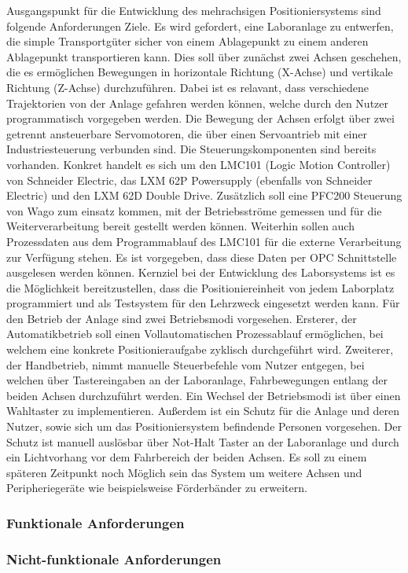 \documentclass[../Bachelorarbeit.tex]{subfiles}
\begin{document}
Ausgangspunkt für die Entwicklung des mehrachsigen Positioniersystems sind folgende Anforderungen \bzw Ziele. Es wird gefordert, eine Laboranlage zu entwerfen, die simple Transportgüter sicher von einem Ablagepunkt zu einem anderen Ablagepunkt transportieren kann. Dies soll über zunächst zwei Achsen geschehen, die es ermöglichen Bewegungen in horizontale Richtung (X-Achse) und vertikale Richtung (Z-Achse) durchzuführen. Dabei ist es relavant, dass verschiedene Trajektorien von der Anlage gefahren werden können, welche durch den Nutzer programmatisch vorgegeben werden. Die Bewegung der Achsen erfolgt über zwei getrennt ansteuerbare Servomotoren, die über einen Servoantrieb mit einer Industriesteuerung verbunden sind. Die Steuerungskomponenten sind bereits vorhanden. Konkret handelt es sich um den LMC101 (Logic Motion Controller) von Schneider Electric, das LXM 62P Powersupply (ebenfalls von Schneider Electric) und den LXM 62D Double Drive. Zusätzlich soll eine PFC200 Steuerung von Wago zum einsatz kommen, mit der Betriebsströme gemessen und für die Weiterverarbeitung bereit gestellt werden können. Weiterhin sollen auch Prozessdaten aus dem Programmablauf des LMC101 für die externe Verarbeitung zur Verfügung stehen. Es ist vorgegeben, dass diese Daten per OPC Schnittstelle ausgelesen werden können. Kernziel bei der Entwicklung des Laborsystems ist es die Möglichkeit bereitzustellen, dass die Positioniereinheit von jedem Laborplatz programmiert und als Testsystem für den Lehrzweck eingesetzt werden kann. Für den Betrieb der Anlage sind zwei Betriebsmodi vorgesehen. Ersterer, der Automatikbetrieb soll einen Vollautomatischen Prozessablauf ermöglichen, bei welchem eine konkrete Positionieraufgabe zyklisch durchgeführt wird. Zweiterer, der Handbetrieb, nimmt manuelle Steuerbefehle vom Nutzer entgegen, bei welchen über Tastereingaben an der Laboranlage, Fahrbewegungen entlang der beiden Achsen durchzuführt werden. Ein Wechsel der Betriebsmodi ist über einen Wahltaster zu implementieren. Außerdem ist ein Schutz für die Anlage und deren Nutzer, sowie sich um das Positioniersystem befindende Personen vorgesehen. Der Schutz ist manuell auslösbar über Not-Halt Taster an der Laboranlage und durch ein Lichtvorhang vor dem Fahrbereich der beiden Achsen. Es soll zu einem späteren Zeitpunkt noch Möglich sein das System um weitere Achsen und Peripheriegeräte wie beispielsweise Förderbänder zu erweitern.

\subsubsection{Funktionale Anforderungen}


\subsubsection{Nicht-funktionale Anforderungen}
\end{document}
